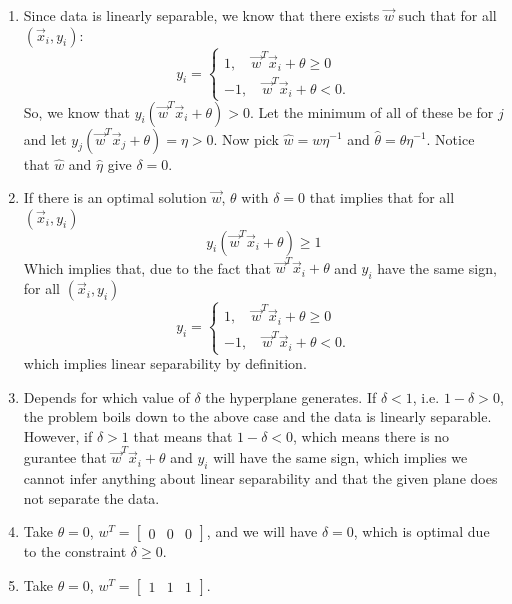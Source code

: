 \documentclass[11pt]{article}
\begin{document}
\begin{enumerate}
\item Since data is linearly separable, we know that there exists $\vec{w}$
  such that for all $(\vec{x}_i, y_i)$:
  \begin{equation*}
    y_i = \begin{cases}
      1, \quad \vec{w}^T\vec{x}_i + \theta \geq 0\\
      -1, \quad \vec{w}^T\vec{x}_i + \theta < 0.
    \end{cases}
  \end{equation*}
  So, we know that $y_i(\vec{w}^T\vec{x}_i + \theta) > 0$. Let the minimum of
  all of these be for $j$ and let
  $y_j(\vec{w}^T\vec{x}_j + \theta) = \eta > 0$. Now pick
  $\hat{w} = w\eta^{-1}$ and $\hat{\theta} = \theta \eta^{-1}$. Notice that
  $\hat{w}$ and $\hat{\eta}$ give $\delta = 0$.
\item If there is an optimal solution $\vec{w}$, $\theta$ with $\delta = 0$
  that implies that for all $(\vec{x}_i, y_i)$
  \begin{equation*}
    y_i(\vec{w}^T\vec{x}_i + \theta) \geq 1
  \end{equation*}
  Which implies that, due to the fact that $\vec{w}^T\vec{x}_i + \theta$
  and $y_i$ have the same sign, for all $(\vec{x}_i, y_i)$
  \begin{equation*}
    y_i = \begin{cases}
      1, \quad \vec{w}^T\vec{x}_i + \theta \geq 0\\
      -1, \quad \vec{w}^T\vec{x}_i + \theta < 0.
    \end{cases}
  \end{equation*}
  which implies linear separability by definition.
\item Depends for which value of $\delta$ the hyperplane generates. If
  $\delta < 1$, i.e. $1-\delta > 0$, the problem boils down to the above case
  and the data is linearly separable. However, if $\delta > 1$ that means that
  $1-\delta < 0$, which means there is no gurantee that
  $\vec{w}^T\vec{x}_i + \theta$ and $y_i$ will have the same sign, which
  implies we cannot infer anything about linear separability and that the given
  plane does not separate the data.
\item Take $\theta = 0$, $w^T = \begin{bmatrix} 0 &0 &0 \end{bmatrix}$, and
  we will have $\delta = 0$, which is optimal due to the constraint
  $\delta \geq 0$.
\item Take $\theta = 0$, $w^T = \begin{bmatrix} 1 &1 &1\end{bmatrix}$.
\end{enumerate}
\newpage
\end{document}
